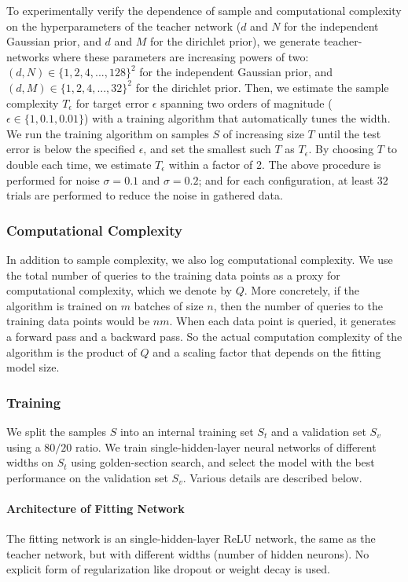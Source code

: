 \documentclass[twoside,11pt]{article}
\begin{document}
To experimentally verify the dependence of sample and computational complexity on the hyperparameters of the teacher network ($d$ and $N$ for the independent Gaussian prior, and $d$ and $M$ for the dirichlet prior), we generate teacher-networks where these parameters are increasing powers of two:
$(d, N) \in\{1,2,4,...,128\}^2$ for the independent Gaussian prior, 
and $(d, M) \in\{1,2,4,...,32\}^2$ for the dirichlet prior.
Then, we estimate the sample complexity $T_\epsilon$ for target error $\epsilon$ spanning two orders of magnitude ($\epsilon\in\{1, 0.1, 0.01\}$) with a training algorithm that automatically tunes the width.
We run the training algorithm on samples $S$ of increasing size $T$ until the test error is below the specified $\epsilon$, and set the smallest such $T$ as $T_\epsilon$.
By choosing $T$ to double each time, we estimate $T_\epsilon$ within a factor of 2.
The above procedure is performed for noise $\sigma=0.1$ and $\sigma=0.2$; and for each configuration, at least $32$ trials are performed to reduce the noise in gathered data.

\subsubsection{Computational Complexity}

In addition to sample complexity, we also log computational complexity.
We use the total number of queries to the training data points as a proxy for computational complexity, which we denote by $Q$.
More concretely, if the algorithm is trained on $m$ batches of size $n$, then the number of queries to the training data points would be $nm$.
When each data point is queried, it generates a forward pass and a backward pass.
So the actual computation complexity of the algorithm is the product of $Q$ and a scaling factor that depends on the fitting model size.
\subsubsection{Training}
\label{apdx:training}
We split the samples $S$ into an internal training set $S_t$ and a validation set $S_v$ using a $80/20$ ratio.
We train single-hidden-layer neural networks of different widths on $S_t$ using golden-section search, and select the model with the best performance on the validation set $S_v$.
Various details are described below.

\paragraph{Architecture of Fitting Network}
The fitting network is an single-hidden-layer ReLU network, the same as the teacher network, but with different widths (number of hidden neurons).
No explicit form of regularization like dropout or weight decay is used.
\end{document}

